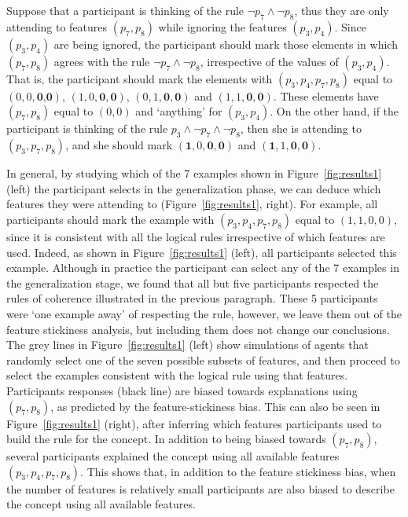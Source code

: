 Suppose that a participant is thinking of %
the rule 
$\lnot p_7 \land \lnot p_8$, thus they are only attending to features $(p_7,p_8)$ while ignoring the features $(p_3,p_4)$. Since $(p_3,p_4)$ are being ignored, the participant should mark those elements in which $(p_7,p_8)$ agrees with the rule $\lnot p_7 \land \lnot p_8$, irrespective of the values of $(p_3,p_4)$. That is, the participant should mark the elements with $(p_3,p_4,p_7,p_8)$ equal to $(0,0,\textbf{0,0})$, $(1,0,\textbf{0},\textbf{0})$, $(0,1,\textbf{0},\textbf{0})$ and $(1,1,\textbf{0},\textbf{0})$. These elements have $(p_7,p_8)$ equal to $(0,0)$ and `anything' for $(p_3,p_4)$. On the other hand, if the participant is thinking of the rule $p_3 \land \lnot p_7 \land \lnot p_8$, then she is attending to $(p_3,p_7,p_8)$, and she should mark $(\textbf{1},0,\textbf{0},\textbf{0})$ and $(\textbf{1},1,\textbf{0},\textbf{0})$. 

In general, by studying which of the 7 examples shown in Figure~\ref{fig:results1} (left) the participant selects in the generalization phase, we can deduce which features they were attending to (Figure~\ref{fig:results1}, right). For example, all participants should mark the example with $(p_3,p_4,p_7,p_8)$ equal to $(1,1,0,0)$, since it is consistent with all the logical rules irrespective of which features are used. %
Indeed, as shown in Figure~\ref{fig:results1} (left), all participants selected this example. Although in practice the participant can select any of the 7 examples in the generalization stage, we found that all but five participants respected the rules of coherence illustrated in the previous paragraph. These 5 participants were `one example away' of respecting the rule, however, we leave them out of the feature stickiness analysis, but including them does not change our conclusions. The grey lines in Figure~\ref{fig:results1} (left) show simulations of agents that randomly select one of the seven possible subsets of features, and then proceed to select the examples consistent with the logical rule using that features. Participants responses (black line) are biased towards explanations using $(p_7,p_8)$, as predicted by the feature-stickiness bias. This can also be seen in  Figure~\ref{fig:results1} (right), after inferring which features participants used to build the rule for the concept. In addition to being biased towards $(p_7,p_8)$, several participants explained the concept using all available features $(p_3,p_4,p_7,p_8)$. This shows that, in addition to the feature stickiness bias, when the number of features is relatively small participants are also biased to describe the concept using all available features.

